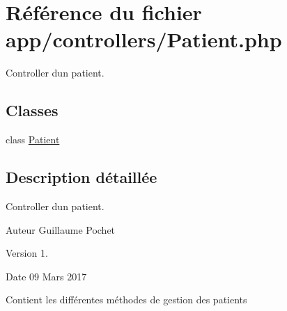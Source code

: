 \hypertarget{_patient_8php}{}\section{Référence du fichier app/controllers/\+Patient.php}
\label{_patient_8php}


Controller d\textquotesingle{}un patient.  


\subsection*{Classes}
\begin{DoxyCompactItemize}
\item 
class \hyperlink{class_patient}{Patient}
\end{DoxyCompactItemize}


\subsection{Description détaillée}
Controller d\textquotesingle{}un patient. 

\begin{DoxyAuthor}{Auteur}
Guillaume Pochet 
\end{DoxyAuthor}
\begin{DoxyVersion}{Version}
1. 
\end{DoxyVersion}
\begin{DoxyDate}{Date}
09 Mars 2017
\end{DoxyDate}
Contient les différentes méthodes de gestion des patients 